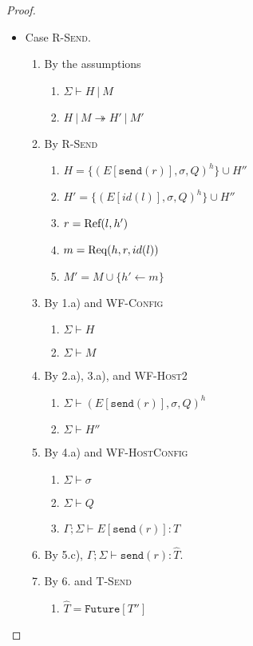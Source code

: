 \begin{proof}
\begin{itemize}
\item Case \textsc{R-Send}.
\begin{enumerate}
\item By the assumptions
  \begin{enumerate}[label=(\alph*)]
  \item $\Sigma \vdash H~|~M$
  \item $H~|~M \twoheadrightarrow H'~|~M'$
  \end{enumerate}
\item By \textsc{R-Send}
  \begin{enumerate}[label=(\alph*)]
  \item $H  = \{ (E[\texttt{send}(r)], \sigma, Q)^h \} \cup H''$
  \item $H' = \{ (E[id(l)], \sigma, Q)^h \} \cup H''$
  \item $r  = {\textrm{Ref}(l, h')}$
  \item $m  = {\textrm{Req}(h, r, id(l))}$
  \item $M' = M \cup \{ h' \leftarrow m \}$
  \end{enumerate}
\item By 1.a) and \textsc{WF-Config}
  \begin{enumerate}[label=(\alph*)]
  \item $\Sigma \vdash H$
  \item $\Sigma \vdash M$
  \end{enumerate}
\item By 2.a), 3.a), and \textsc{WF-Host2}
  \begin{enumerate}[label=(\alph*)]
  \item $\Sigma \vdash (E[\texttt{send}(r)], \sigma, Q)^h$
  \item $\Sigma \vdash H''$
  \end{enumerate}
\item By 4.a) and \textsc{WF-HostConfig}
  \begin{enumerate}[label=(\alph*)]
  \item $\Sigma \vdash \sigma$
  \item $\Sigma \vdash Q$
  \item $\Gamma ; \Sigma \vdash E[\texttt{send}(r)] : T$
  \end{enumerate}
\item By 5.c), $\Gamma ; \Sigma \vdash \texttt{send}(r) : \hat{T}$.
\item By 6. and \textsc{T-Send}
  \begin{enumerate}[label=(\alph*)]
  \item $\hat{T} = \texttt{Future}[T'']$

\end{enumerate}
\end{enumerate}
\end{itemize}
\end{proof}
